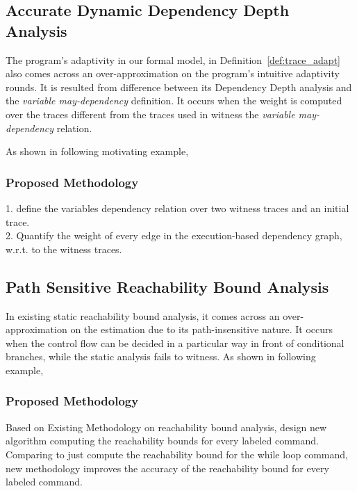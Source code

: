 \subsection{Accurate Dynamic Dependency Depth Analysis}
\label{subsec:furthers-dep-depth}
%
The program's adaptivity in our formal model,
in Definition~\ref{def:trace_adapt} also
 comes across an over-approximation on the program's
 intuitive adaptivity rounds.
It is resulted from difference between its Dependency Depth analysis and the \emph{variable may-dependency} definition.
It occurs when the weight is computed over the traces different from the traces used in 
witness the \emph{variable may-dependency} relation.

As shown in following motivating example, 

% 
\subsubsection{Proposed Methodology}
\label{subsubsec:furthers-dep-depth}
% 
1. define the variables dependency relation over two witness traces and an initial trace.
\\
2. Quantify the weight of every edge in the execution-based dependency graph, w.r.t. to the witness traces.
\\

\subsection{Path Sensitive Reachability Bound Analysis}
\label{subsec:furthers-reachability}
In existing static reachability bound analysis, 
it comes across an over-approximation on the estimation due to its path-insensitive nature. 
It occurs when the control flow can be decided in a particular way in front of conditional branches, 
while the static analysis fails to witness. 
As shown in following example, 


\subsubsection{Proposed Methodology}
\label{subsubsec:furthers-reachability}
Based on Existing Methodology on reachability bound analysis, design new algorithm computing the 
reachability bounds for every labeled command.
Comparing to just compute the reachability bound for the while loop command, new methodology improves the accuracy of the 
reachability bound for every labeled command.

